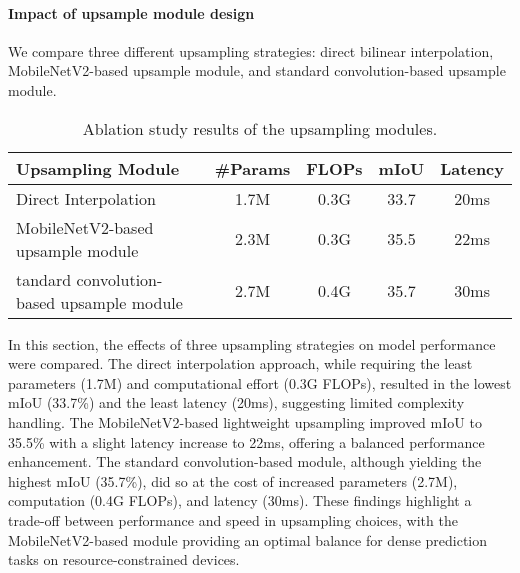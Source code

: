 \paragraph{Impact of upsample module design}
We compare three different upsampling strategies: direct bilinear interpolation, MobileNetV2-based upsample module, and standard convolution-based upsample module.
\begin{table}[ht]
\centering
\begin{tabular}{lcccc}
\hline

\hline

\hline
Upsampling Module & \#Params & FLOPs &  mIoU & Latency \\
\hline
Direct Interpolation & 1.7M & 0.3G & 33.7 & 20ms\\
MobileNetV2-based upsample module & 2.3M & 0.3G & 35.5 & 22ms \\
tandard convolution-based upsample module & 2.7M & 0.4G & 35.7 & 30ms\\
\hline

\hline

\hline
\end{tabular}
\caption{Ablation study results of the upsampling modules.}
\label{tab:upsampling_ablation}
\end{table}
In this section, the effects of three upsampling strategies on model performance were compared. The direct interpolation approach, while requiring the least parameters (1.7M) and computational effort (0.3G FLOPs), resulted in the lowest mIoU (33.7\%) and the least latency (20ms), suggesting limited complexity handling. The MobileNetV2-based lightweight upsampling improved mIoU to 35.5\% with a slight latency increase to 22ms, offering a balanced performance enhancement. The standard convolution-based module, although yielding the highest mIoU (35.7\%), did so at the cost of increased parameters (2.7M), computation (0.4G FLOPs), and latency (30ms). These findings highlight a trade-off between performance and speed in upsampling choices, with the MobileNetV2-based module providing an optimal balance for dense prediction tasks on resource-constrained devices.

